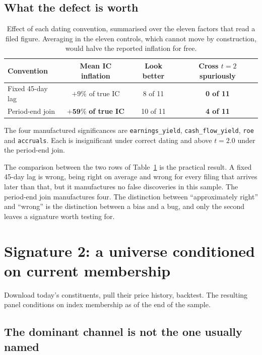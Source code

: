 \documentclass[11pt]{article}
\newcommand{\fac}[1]{\texttt{\small #1}}
\begin{document}
\subsection{What the defect is worth}

\begin{table}[h]
\centering
\small
\begin{tabular}{lccc}
\toprule
Convention & Mean IC inflation & Look better & Cross $t=2$ spuriously \\
\midrule
Fixed 45-day lag & $+9\%$ of true IC & 8 of 11 & \textbf{0 of 11} \\
Period-end join & $\mathbf{+59\%}$ \textbf{of true IC} & 10 of 11 & \textbf{4 of 11} \\
\bottomrule
\end{tabular}
\caption{Effect of each dating convention, summarised over the eleven factors that read
a filed figure. Averaging in the eleven controls, which cannot move by construction,
would halve the reported inflation for free.}
\label{tab:dating}
\end{table}

The four manufactured significances are \fac{earnings\_yield}, \fac{cash\_flow\_yield},
\fac{roe} and \fac{accruals}. Each is insignificant under correct dating and above
$t = 2.0$ under the period-end join.

The comparison between the two rows of Table~\ref{tab:dating} is the practical result. A
fixed 45-day lag is wrong, being right on average and wrong for every filing that arrives
later than that, but it manufactures no false discoveries in this sample. The period-end
join manufactures four. The distinction between ``approximately right'' and ``wrong'' is
the distinction between a bias and a bug, and only the second leaves a signature worth
testing for.

\section{Signature 2: a universe conditioned on current membership}
\label{sec:surv}

Download today's constituents, pull their price history, backtest. The resulting panel
conditions on index membership as of the end of the sample.

\subsection{The dominant channel is not the one usually named}
\end{document}
